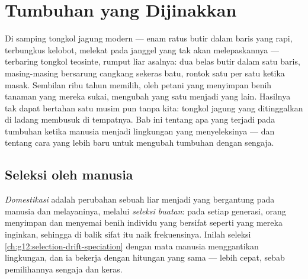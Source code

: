 \chapter{Tumbuhan yang Dijinakkan}\label{ch:g12:domesticated-plants}

Di samping tongkol jagung modern --- enam ratus butir dalam baris yang
rapi, terbungkus kelobot, melekat pada janggel yang tak akan
melepaskannya --- terbaring tongkol teosinte, rumput liar asalnya: dua
belas butir dalam satu baris, masing-masing bersarung cangkang sekeras
batu, rontok satu per satu ketika masak. Sembilan ribu tahun memilih,
oleh petani yang menyimpan benih tanaman yang mereka sukai, mengubah
yang satu menjadi yang lain. Hasilnya tak dapat bertahan satu musim
pun tanpa kita: tongkol jagung yang ditinggalkan di ladang membusuk di
tempatnya. Bab ini tentang apa yang terjadi pada tumbuhan ketika
manusia menjadi lingkungan yang menyeleksinya --- dan tentang cara
yang lebih baru untuk mengubah  tumbuhan dengan sengaja.

\section{Seleksi oleh manusia}

\begin{definition}\label{def:g12:domesticated-plants:domestication}
\emph{Domestikasi} adalah perubahan sebuah 
liar menjadi  yang bergantung pada manusia dan melayaninya,
melalui \emph{seleksi buatan}: pada setiap
generasi, orang menyimpan dan menyemai benih individu yang bersifat
seperti yang mereka inginkan, sehingga  di balik sifat itu naik
frekuensinya. Inilah seleksi \cref{ch:g12:selection-drift-speciation}
dengan mata manusia menggantikan lingkungan, dan ia bekerja dengan
hitungan yang sama --- lebih cepat, sebab pemilihannya sengaja dan
keras.
\end{definition}

